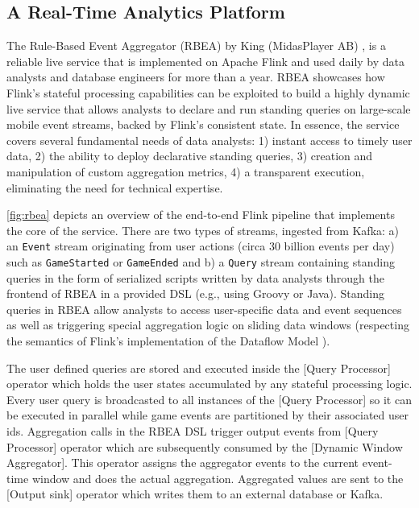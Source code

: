 




\subsection{A Real-Time Analytics Platform}

The Rule-Based Event Aggregator (RBEA) by King (MidasPlayer AB) \cite{CUSTOM:web/kingrbea}, is a reliable live service that is implemented on Apache Flink and used daily by data analysts and database engineers for more than a year. RBEA showcases how Flink's stateful processing capabilities can be exploited to build a highly dynamic live service that allows analysts to declare and run standing queries on large-scale mobile event streams, backed by Flink's consistent state. In essence, the service covers several fundamental needs of data analysts: 1) instant access to timely user data, 2) the ability to deploy declarative standing queries, 3) creation and manipulation of custom aggregation metrics, 4) a transparent execution, eliminating the need for technical expertise.

\autoref{fig:rbea} depicts an overview of the end-to-end Flink pipeline that implements the core of the service. There are two types of streams, ingested from Kafka: a) an \texttt{Event} stream originating from  user actions (circa 30 billion events per day) such as \texttt{GameStarted} or \texttt{GameEnded} and b) a \texttt{Query} stream containing standing queries in the form of serialized scripts written by data analysts through the frontend of RBEA in a provided DSL (e.g., using Groovy or Java). Standing queries in RBEA allow analysts to access user-specific data and event sequences as well as triggering special aggregation logic on sliding data windows (respecting the semantics of Flink's implementation of the Dataflow Model \cite{akidau2015dataflow}). 

The user defined queries are stored and executed inside the [Query Processor] operator which holds the user states accumulated by any stateful processing logic. Every user query is broadcasted to all instances of the [Query Processor] so it can be executed in parallel while game events are partitioned by their associated user ids. Aggregation calls in the RBEA DSL trigger output events from [Query Processor] operator which are subsequently consumed by the [Dynamic Window Aggregator]. This operator assigns the aggregator events to the current event-time window and does the actual aggregation. Aggregated values are sent to the [Output sink] operator which writes them to an external database or Kafka.

